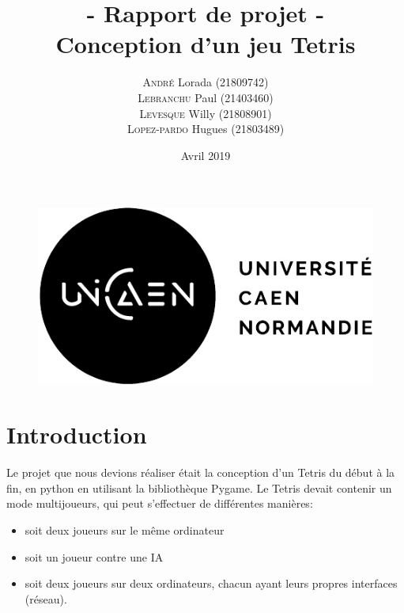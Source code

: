 \documentclass[a4paper, 11pt]{article}
\title{- Rapport de projet - \\ Conception d'un jeu Tetris}
\author{\textsc{André} Lorada  (21809742) \\ \textsc{Lebranchu} Paul  (21403460) \\ \textsc{Levesque} Willy  (21808901)  \\ \textsc{Lopez-pardo} Hugues  (21803489) }
\date{Avril 2019}
\begin{document}
    \begin{titlepage}
        \begin{figure}[t]
            \includegraphics[scale=1]{images/logo.png}
        \end{figure}
        
        \maketitle
        
        \thispagestyle{empty}
    \end{titlepage}

    \newpage
    \tableofcontents

    \newpage
    \section{Introduction}
        Le projet que nous devions réaliser était la conception d'un Tetris du début à la fin, en python en utilisant la bibliothèque Pygame. Le Tetris devait contenir un mode multijoueurs, qui peut s'effectuer de différentes manières: 
        
        \begin{itemize}
            \item soit deux joueurs sur le même ordinateur
            \item soit un joueur contre une IA
            \item soit deux joueurs sur deux ordinateurs, chacun ayant leurs propres interfaces (réseau).
        \end{itemize}
        
\end{document}
